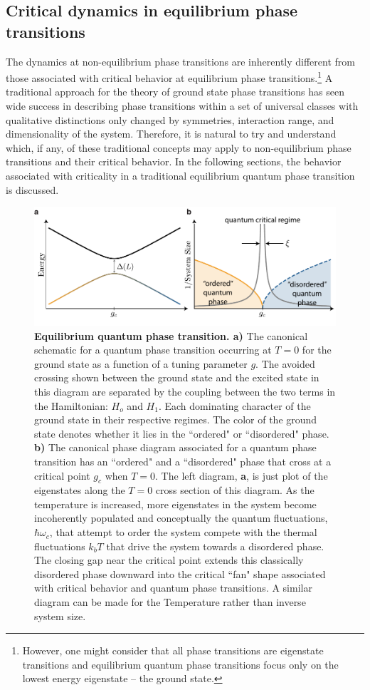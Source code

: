 \subsection{Critical dynamics in equilibrium phase transitions}

The dynamics at non-equilibrium phase transitions are inherently different from those associated with critical behavior at equilibrium phase transitions.\footnote{However, one might consider that all phase transitions are eigenstate transitions and equilibrium quantum phase transitions focus only on the lowest energy eigenstate -- the ground state.} A traditional approach for the theory of ground state phase transitions has seen wide success in describing phase transitions within a set of universal classes with qualitative distinctions only changed by symmetries, interaction range, and dimensionality of the system. Therefore, it is natural to try and understand which, if any, of these traditional concepts may apply to non-equilibrium phase transitions and their critical behavior. In the following sections, the behavior associated with criticality in a traditional equilibrium quantum phase transition is discussed.

\begin{figure}[t!]
		\includegraphics[width=\columnwidth]{figures/ch3/qpt_2.pdf} 
		\caption{\textbf{Equilibrium quantum phase transition. a)} The canonical schematic for a quantum phase transition occurring at $T=0$ for the ground state as a function of a tuning parameter $g$. The avoided crossing shown between the ground state and the excited state in this diagram are separated by the coupling between the two terms in the Hamiltonian:  $H_o$ and $H_1$. Each dominating character of the ground state in their respective regimes. The color of the ground state denotes whether it lies in the ``ordered" or ``disordered" phase. \textbf{b)}  The canonical phase diagram associated for a quantum phase transition has an ``ordered" and a ``disordered" phase that cross at a critical point $g_c$ when $T=0$. The left diagram, \textbf{a}, is just plot of the eigenstates along the $T=0$ cross section of this diagram. As the temperature is increased, more eigenstates in the system become incoherently populated and conceptually the quantum fluctuations, $\hbar \omega_c$, that attempt to order the system compete with the thermal fluctuations $k_b T$ that drive the system towards a disordered phase.  The closing gap near the critical point extends this classically disordered phase downward into the critical ``fan" shape associated with critical behavior and quantum phase transitions. A similar diagram can be made for the Temperature rather than inverse system size.}
		\label{fig:eq_qpt}	
\end{figure}

